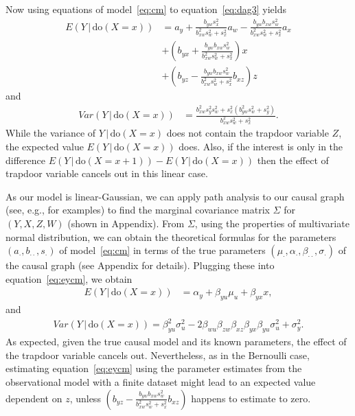 \documentclass{statsoc}
\newcommand{\+}[1]{\ensuremath{\mathbf{#1}}}
\newcommand{\doo}{\textrm{do}}
\newcommand{\given}{{ \, | \, }}
\newcommand{\z}{trapdoor variable}
\begin{document}
Now using equations of model~\eqref{eq:cm} to equation~\eqref{eq:dag3} yields
\begin{equation} 
\label{eq:eycm}
\begin{aligned}
E(Y \given  \doo(X = x)) &= 
 a_y + \frac{b_{yw}s_x^2}{b_{xw}^2 s_w^2+s_x^2}a_w - \frac{b_{yw}b_{xw}s_w^2}{b_{xw}^2 s_w^2+s_x^2}a_x\\
&+ \left(b_{yx} + \frac{b_{yw} b_{xw} s_w^2}{b_{xw}^2 s_w^2+s_x^2}\right)x\\
&+ \left(b_{yz} -\frac{b_{yw} b_{xw} s_w^2}{b_{xw}^2 s_w^2+s_x^2}b_{xz}\right)z
\end{aligned}
\end{equation}
and
\begin{equation*}
\begin{aligned}
Var(Y \given  \doo(X = x)) &= \frac{b_{xw}^2 s_y^2 s_w^2+s_x^2 \left(b_{yw}^2 s_w^2+s_y^2\right)}{b_{xw}^2 s_w^2+s_x^2}.
\end{aligned}
\end{equation*}
While the variance of $Y \given \doo(X = x)$ does not contain the \z{} $Z$, the expected value $E(Y \given  \doo(X = x))$ does. Also, if the interest is only in the difference $E(Y \given \doo(X = x+1)) - E(Y \given \doo(X = x))$ then the effect of \z{} cancels out in this linear case.

As our model is linear-Gaussian, we can apply path analysis \citep{wright1934} to our causal graph (see, e.g., \citet{Pearl2013} for examples) to find the marginal covariance matrix $\Sigma$ for $(Y, X, Z, W)$ (shown in Appendix). From $\Sigma$, using the properties of multivariate normal distribution, we can obtain the theoretical formulas for the parameters $(a_{\cdot}, b_{\cdot\cdot}, s_{\cdot})$ of model~\eqref{eq:cm} in terms of the true parameters $(\mu_{\cdot}, \alpha_{\cdot},\beta_{\cdot\cdot},\sigma_{\cdot})$ of the causal graph (see Appendix for details). Plugging these into equation~\eqref{eq:eycm}, we obtain
\begin{equation*}
\begin{aligned}
E(Y \given  \doo(X = x)) &= \alpha_y + \beta_{yu}\mu_u + \beta_{yx} x,
\end{aligned}
\end{equation*}
and
\begin{equation*}
\begin{aligned}
Var(Y \given  \doo(X = x)) = \beta_{yu}^2\sigma_u^2 - 2\beta_{wu}\beta_{zw}\beta_{xz}\beta_{yx}\beta_{yu}\sigma_u^2 + \sigma_y^2.
\end{aligned}
\end{equation*}
As expected, given the true causal model and its known parameters, the effect of the \z{} cancels out. Nevertheless, as in the Bernoulli case, estimating equation~\eqref{eq:eycm} using the parameter estimates from the observational model with a finite dataset might lead to an expected value dependent on $z$, unless $\left(b_{yz} -\frac{b_{yw} b_{xw} s_w^2}{b_{xw}^2 s_w^2+s_x^2}b_{xz}\right)$ happens to estimate to zero.
\end{document}
